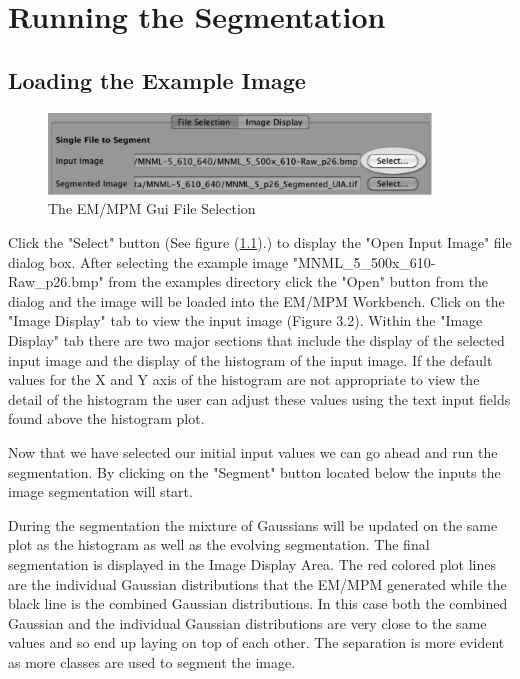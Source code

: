 \documentclass[12pt,oneside]{book}
\begin{document}
%
\chapter{Running the Segmentation}

\section{Loading the Example Image}

\begin{figure}[htbp]
\begin{center}
\includegraphics[width=4.0in]{images/Untitled1.png}
\caption{The EM/MPM Gui File Selection}
\label{image1}
\end{center}
\end{figure}

Click the "Select" button (See figure (\ref{image1}).) to display the "Open Input Image" file dialog box. After selecting the example image "MNML\_5\_500x\_610-Raw\_p26.bmp" from the examples directory click the "Open" button from the dialog and the image will be loaded into the EM/MPM Workbench. Click on the "Image Display" tab to view the input image (Figure 3.2). Within the "Image Display" tab there are two major sections that include the display of the selected input image and the display of the histogram of the input image. If the default values for the X and Y axis of the histogram are not appropriate to view the detail of the histogram the user can adjust these values using the text input fields found above the histogram plot. 

Now that we have selected our initial input values we can go ahead and run the segmentation. By clicking on the "Segment" button located below the inputs the image segmentation will start. 

During the segmentation the mixture of Gaussians will be updated on the same plot as the histogram as well as the evolving segmentation. The final segmentation is displayed in the Image Display Area. The red colored plot lines are the individual Gaussian distributions that the EM/MPM generated while the black line is the combined Gaussian distributions. In this case both the combined Gaussian and the individual Gaussian distributions are very close to the same values and so end up laying on top of each other. The separation is more evident as more classes are used to segment the image. 
 
\end{document}
